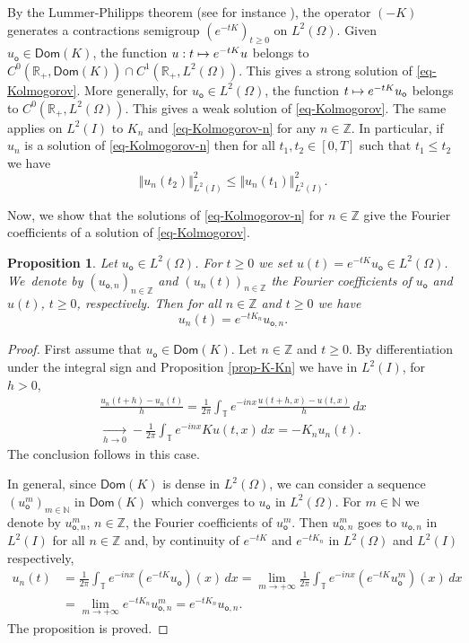 \documentclass[10pt]{amsart}
\def\mto{\mathchoice{\longmapsto}{\mapsto}{\mapsto}{\mapsto}}
\theoremstyle{plain}
\newtheorem{proposition}[theorem]{Proposition}
\theoremstyle{definition}
\newcommand {\limt}[2]{\xrightarrow[#1 \to #2]{}}
\newcommand{\nr}[1]{\Vert #1\Vert}
\newcommand{\1}{\mathds 1}
\newcommand{\Dom}{\mathsf{Dom}}
\newcommand{\R}{\mathbb{R}}
\newcommand{\N}{\mathbb{N}}
\newcommand{\Z}{\mathbb{Z}}
\newcommand{\T}{\mathbb{T}}
\let\O\Omega
\newcommand{\uo}{u_{\mathsf{o}}}
\newcommand{\uon}{u_{\mathsf{o},n}}
\begin{document}
By the Lummer-Philipps theorem (see for instance \cite{engel}), the operator $(-K)$ generates a contractions semigroup $(e^{-tK})_{t \geq 0}$ on $L^2(\O)$. Given $\uo \in \Dom(K)$, the function $u : t \mto e^{-tK} u$ belongs to $C^0(\R_+,\Dom(K)) \cap C^1(\R_+,L^2(\O))$. This gives a strong solution of \eqref{eq-Kolmogorov}. More generally, for $\uo \in L^2(\O)$, the function $t \mto e^{-tK} \uo$ belongs to $C^0(\R_+,L^2(\O))$. This gives a weak solution of \eqref{eq-Kolmogorov}. The same applies on $L^2(I)$ to $K_n$ and \eqref{eq-Kolmogorov-n} for any $n \in \Z$. In particular, if $u_n$ is a solution of \eqref{eq-Kolmogorov-n} then for all $t_1,t_2 \in [0,T]$ such that $t_1 \leq t_2$ we have
\begin{equation} \label{eq-semigroup-contraction}
\nr{u_n(t_2)}_{L^2(I)}^2 \leq \nr{u_n(t_1)}_{L^2(I)}^2.
\end{equation}

Now, we show that the solutions of \eqref{eq-Kolmogorov-n} for $n \in \Z$ give the Fourier coefficients of a solution of \eqref{eq-Kolmogorov}.

\begin{proposition} \label{prop-Fourier-propagateurs}
Let $\uo \in L^2(\O)$. For $t \geq 0$ we set $u(t) = e^{-tK} \uo \in L^2(\O)$. We~denote by $(\uon)_{n \in \Z}$ and $(u_n(t))_{n \in \Z}$ the Fourier coefficients of $\uo$ and $u(t)$, $t \geq 0$, respectively. Then for all $n \in \Z$ and $t \geq 0$ we have
\[
u_n(t) = e^{-t K_n} \uon.
\]
\end{proposition}

\begin{proof}
First assume that $\uo \in \Dom(K)$. Let $n \in \Z$ and $t \geq 0$. By differentiation under the integral sign and Proposition \ref{prop-K-Kn} we have in $L^2(I)$, for $h > 0$,
\begin{multline*}
\frac {u_n(t+h) - u_n(t)} h = \frac 1 {2\pi} \int_\T e^{-inx} \frac {u(t+h,x) - u(t,x)} h \, dx\\
\limt h 0 - \frac 1 {2\pi} \int_\T e^{-inx} K u(t,x) \, dx = -K_n u_n(t).
\end{multline*}
The conclusion follows in this case.

In general, since $\Dom(K)$ is dense in $L^2(\O)$, we can consider a sequence $(u_{\mathsf{o}}^m)_{m \in \N}$ in $\Dom(K)$ which converges to $\uo$ in $L^2(\O)$. For $m \in \N$ we denote by $u_{\mathsf{o},n}^m$, $n \in \Z$, the Fourier coefficients of $u_{\mathsf{o}}^m$. Then $u_{\mathsf{o},n}^m$ goes to $u_{\mathsf{o},n}$ in $L^2(I)$ for all $n \in \Z$ and, by continuity of $e^{-tK}$ and $e^{-tK_n}$ in $L^2(\O)$ and $L^2(I)$ respectively,
\begin{align*}
u_n(t)
& = \frac 1 {2\pi} \int_\T e^{-inx} (e^{-tK} \uo)(x) \,dx = \lim_{m \to +\infty} \frac 1 {2\pi} \int_\T e^{-inx} (e^{-tK} u_{\mathsf{o}}^m)(x) \,dx\\
& = \lim_{m \to +\infty} e^{-tK_n} u_{\mathsf{o},n}^m = e^{-tK_n} \uon.
\end{align*}
The proposition is proved.
\end{proof}
\end{document}
